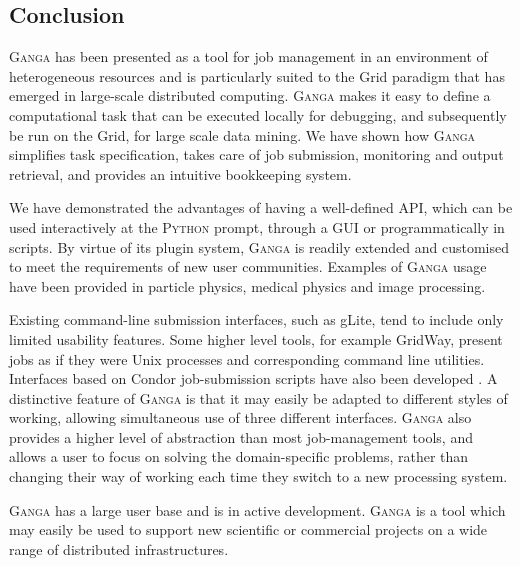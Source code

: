 \documentclass{elsart}
\def\ganga {\textsc{Ganga}\xspace}
\def\python {\textsc{Python}\xspace}
\def\grid {Grid\xspace}
\newcommand{\qq}[1]{#1}
\begin{document}
\begin{linenumbers}
\section{Conclusion}
\label{sec:conclusion}
\ganga has been presented as a tool for job management in an environment of heterogeneous resources
and is particularly suited to the \grid paradigm that has emerged in large-scale distributed computing.
\ganga makes it easy to define a
computational task that can be executed locally for debugging, and
subsequently be run on the \grid, for large scale data mining. We have shown how \ganga
simplifies task specification, takes care of job submission, monitoring and
output retrieval, and provides an intuitive bookkeeping system.

We have demonstrated the advantages of having a well-defined API, which can be
used interactively at the \python prompt, through a GUI or
programmatically in scripts. By virtue of its plugin system, \ganga is readily
extended and customised to meet the requirements of new user communities.
Examples of \ganga usage have been provided in particle physics,
medical physics and image processing.

\qq{
Existing command-line submission interfaces, such as gLite, tend to
include only limited usability features.  Some higher level tools,
for example GridWay\cite{GridWay}, present jobs as if they were Unix processes and
corresponding command line utilities. Interfaces based on Condor
job-submission scripts have also been developed \cite{MCS}. A distinctive
feature of \ganga is that it may easily be adapted to different styles
of working, allowing simultaneous use of three different interfaces.
\ganga also provides a higher level of abstraction than most job-management
tools, and allows a user to focus on solving the domain-specific problems,
rather than changing their way of working each time they switch to a new
processing system.
}

%



\ganga has a large user base and is in active development. \ganga is a tool which may easily
be used to support new scientific or commercial projects on a wide range of distributed
infrastructures.


\end{linenumbers}
\end{document}
